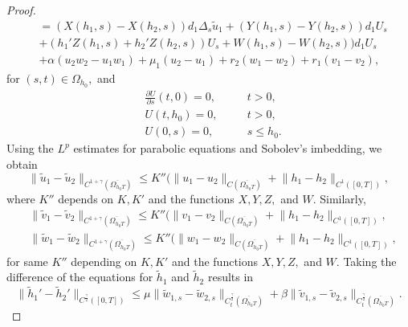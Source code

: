 \documentclass[11pt]{amsart}
\numberwithin{equation}{section}
\theoremstyle{plain}
\theoremstyle{definition}
\begin{document}
\begin{proof}
\begin{equation*}
\begin{aligned}
				&=(X(h_1,s)-X(h_2,s))d_1 \Delta_s \widetilde u_1 + (Y(h_1,s)-Y(h_2,s))d_1U_s\\
				&+(h_1'Z(h_1,s)+h_2'Z(h_2,s))U_s+W(h_1,s)-W(h_2,s))d_1U_s\\
				&+\alpha(u_2w_2-u_1w_1)+\mu_1(u_2-u_1)+r_2(w_1-w_2)+r_1(v_1-v_2),
			\end{aligned}
		\end{equation*}
		for $(s,t)\in\Omega_{h_0},$ and
		\begin{equation*}
			\begin{aligned}
				&\frac{\partial U}{\partial s}(t,0)=0, &&\quad t>0,\\
				&U(t,h_0)=0, &&\quad t>0,\\
				&U(0,s)=0, &&\quad s\leq h_0.
			\end{aligned}
		\end{equation*}
		Using the $L^p$ estimates for parabolic equations and Sobolev's imbedding, we obtain
		\begin{equation} \label{u tilde}
			\lVert \widetilde u_1 - \widetilde u_2 \rVert_{C^{1+\gamma}(\overline{\Omega_{h_0 T}})} \leq K''(\lVert u_1 - u_2 \rVert_{C(\overline{\Omega_{h_0 T}})}+\lVert h_1 -h_2 \rVert_{C^1([0,T])},
		\end{equation}
		where $K''$ depends on $K, K'$ and the functions $X, Y, Z,$ and $W$. Similarly, 
		\begin{equation} \label{vw tilde}
			\begin{aligned}
				&\lVert \widetilde v_1 - \widetilde v_2 \rVert_{C^{1+\gamma}(\overline{\Omega_{h_0 T}})} \leq K''(\lVert v_1 - v_2 \rVert_{C(\overline{\Omega_{h_0 T}})}+\lVert h_1 -h_2 \rVert_{C^1([0,T])},\\
				&\lVert \widetilde w_1 - \widetilde w_2 \rVert_{C^{1+\gamma}(\overline{\Omega_{h_0 T}})} \leq K''(\lVert w_1 - w_2 \rVert_{C(\overline{\Omega_{h_0 T}})}+\lVert h_1 -h_2 \rVert_{C^1([0,T])},
			\end{aligned}
		\end{equation}
		for same $K''$ depending on $K, K'$ and the functions $X, Y, Z,$ and $W$. Taking the difference of the equations for $\widetilde h_1$ and $\widetilde h_2$ results in
		\begin{equation} \label{h tilde}
			\lVert \widetilde h_1'-\widetilde h_2' \rVert_{C^{\frac{\gamma}{2}}([0,T])}\leq \mu \lVert \widetilde w_{1,s} - \widetilde w_{2,s} \rVert_{C_t^{\frac{\gamma}{2}}(\overline{\Omega_{h_0 T}})} + \beta \lVert \widetilde v_{1,s} - \widetilde v_{2,s} \rVert_{C_t^{\frac{\gamma}{2}}(\overline{\Omega_{h_0 T}})}.

\end{equation}
\end{proof}
\end{document}
